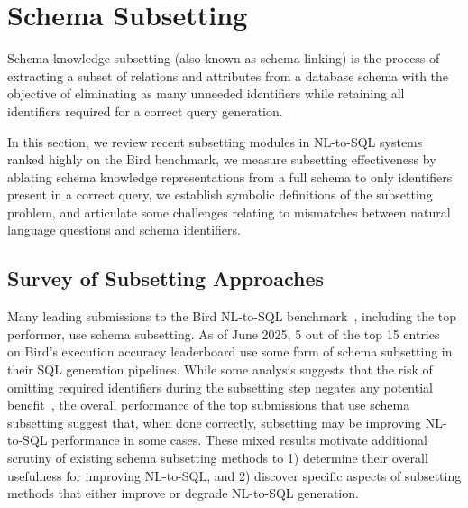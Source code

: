 \section{Schema Subsetting}


Schema knowledge subsetting (also known as schema linking) is the process of extracting a subset of relations and attributes from a database schema with the objective of eliminating as many unneeded identifiers while retaining all identifiers required for a correct query generation.

In this section, we review recent subsetting modules in NL-to-SQL systems ranked highly on the Bird benchmark, we measure subsetting effectiveness by ablating schema knowledge representations from a full schema to only identifiers present in a correct query, we establish symbolic definitions of the subsetting problem, and articulate some challenges relating to mismatches between natural language questions and schema identifiers. 

\subsection{Survey of Subsetting Approaches}

Many leading submissions to the Bird NL-to-SQL benchmark~\cite{benchmark-bird}, including the top performer, use schema subsetting.
As of June 2025, 5 out of the top 15 entries~\cite{shkapenyuk2025automaticmetadataextractiontexttosql,gao2025previewxiyansqlmultigeneratorensemble, xie2025opensearchsqlenhancingtexttosqldynamic, donder2025cheaperbetterfasterstronger,talaei2024chesscontextualharnessingefficient} on Bird's execution accuracy leaderboard use some form of schema subsetting in their SQL generation pipelines.
While some analysis suggests that the risk of omitting required identifiers during the subsetting step negates any potential benefit~\cite{maamari2024deathschemalinkingtexttosql}, the overall performance of the top submissions that use schema subsetting suggest that, when done correctly, subsetting may be improving NL-to-SQL performance in some cases.
These mixed results motivate additional scrutiny of existing schema subsetting methods to 1) determine their overall usefulness for improving NL-to-SQL, and 2) discover specific aspects of subsetting methods that either improve or degrade NL-to-SQL generation.

